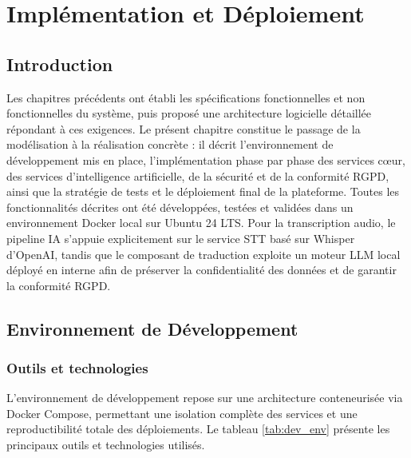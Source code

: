 \chapter{Implémentation et Déploiement}

\section*{Introduction}
Les chapitres précédents ont établi les spécifications fonctionnelles et non fonctionnelles du système, puis proposé une architecture logicielle détaillée répondant à ces exigences. Le présent chapitre constitue le passage de la modélisation à la réalisation concrète : il décrit l'environnement de développement mis en place, l'implémentation phase par phase des services c\oe{}ur, des services d'intelligence artificielle, de la sécurité et de la conformité RGPD, ainsi que la stratégie de tests et le déploiement final de la plateforme. Toutes les fonctionnalités décrites ont été développées, testées et validées dans un environnement Docker local sur Ubuntu 24 LTS. Pour la transcription audio, le pipeline IA s'appuie explicitement sur le service STT basé sur Whisper d'OpenAI, tandis que le composant de traduction exploite un moteur LLM local déployé en interne afin de préserver la confidentialité des données et de garantir la conformité RGPD.

\section{Environnement de Développement}

\subsection{Outils et technologies}
L'environnement de développement repose sur une architecture conteneurisée via Docker Compose, permettant une isolation complète des services et une reproductibilité totale des déploiements. Le tableau \ref{tab:dev_env} présente les principaux outils et technologies utilisés.

